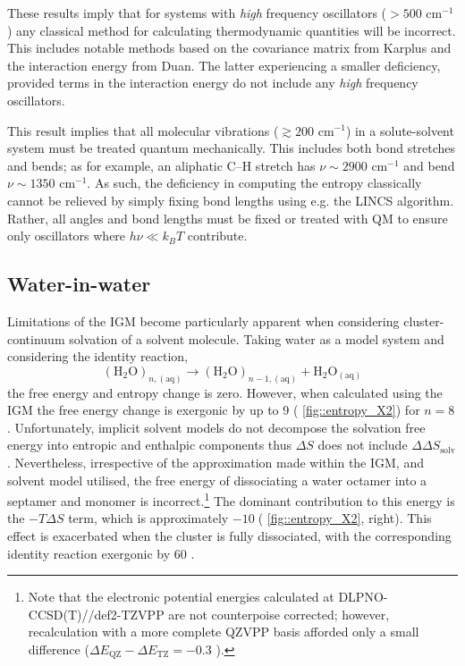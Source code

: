 \documentclass[../main.tex]{subfiles}
\begin{document}

These results imply that for systems with \emph{high} frequency oscillators ($> 500$ cm$^{-1}$) any classical method for calculating thermodynamic quantities will be incorrect. This includes notable methods based on the covariance matrix from Karplus\cite{Karplus1981} and the interaction energy from Duan\cite{Duan2016}. The latter experiencing a smaller deficiency, provided terms in the interaction energy do not include any \emph{high} frequency oscillators. 

This result implies that all molecular vibrations ($\gtrsim 200\text{ cm}^{-1}$) in a solute-solvent system must be treated quantum mechanically. This includes both bond stretches and bends; as for example, an aliphatic C--H stretch has $\nu \sim 2900$ cm$^{-1}$ and bend $\nu \sim 1350$ cm$^{-1}$.\cite{Coates2006} As such, the deficiency in computing the entropy classically cannot be relieved by simply fixing bond lengths using e.g. the LINCS algorithm.\cite{Hess1998} Rather, all angles and bond lengths must be fixed or treated with QM to ensure only oscillators where $h\nu \ll k_B T$ contribute. 


\subsection{Water-in-water}

Limitations of the IGM become particularly apparent when considering cluster-continuum solvation of a solvent molecule. Taking water as a model system and considering the identity reaction,
\[(\text{H}_2\text{O})_{n, (\text{aq})} \rightarrow (\text{H}_2\text{O})_{n - 1, (\text{aq})} + \text{H}_2\text{O}_{(\text{aq})}
\]
the free energy and entropy change is zero. However, when calculated using the IGM the free energy change is exergonic by up to 9 \kcal (\figurename{ \ref{fig::entropy_X2}}) for $n=8$. Unfortunately, implicit solvent models do not decompose the solvation free energy into entropic and enthalpic components thus $\Delta S$ does not include $\Delta\Delta S_\text{solv}$. Nevertheless, irrespective of the approximation made within the IGM, and solvent model utilised, the free energy of dissociating a water octamer into a septamer and monomer is incorrect.\footnote{Note that the electronic potential energies calculated at DLPNO-CCSD(T)//def2-TZVPP are not counterpoise corrected; however, recalculation with a more complete QZVPP basis afforded only a small difference ($\Delta E_\text{QZ} - \Delta E_\text{TZ} = -0.3$ \kcal).} The dominant contribution to this energy is the $-T\Delta S$ term, which is approximately $ -10\;$\kcalx (\figurename{ \ref{fig::entropy_X2}, right}). This effect is exacerbated when the cluster is fully dissociated, with the corresponding identity reaction exergonic by 60 \kcal. 
\end{document}
